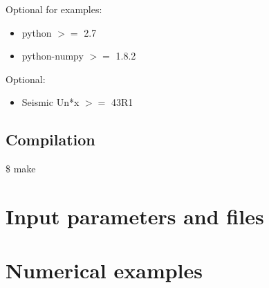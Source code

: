 \documentclass{smanual}
\newcommand{\addbash}[1]{
	\begin{center}
	\colorbox{bashgray}{\begin{minipage}{0.9\textwidth}
  	\ttfamily \$ #1
\end{minipage}}
	\end{center}
}
\begin{document}
\noindent Optional for examples:
\begin{itemize}
	\item python $>=$ 2.7
	\item python-numpy $>=$ 1.8.2
\end{itemize}

\noindent Optional:
\begin{itemize}
	\item Seismic Un*x $>=$ 43R1
\end{itemize}

\subsection{Compilation}

\addbash{make}

\section{Input parameters and files}

\section{Numerical examples}

%


\cite{aki2002quantitative}


\printindex
\end{document}
